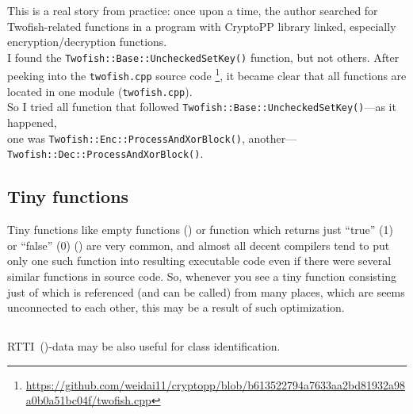 This is a real story from practice: once upon a time, the author searched for Twofish-related functions in
a program with CryptoPP library linked, especially encryption/decryption functions.\\
I found the \verb|Twofish::Base::UncheckedSetKey()| function, but not others.
After peeking into the \verb|twofish.cpp| source code
\footnote{\url{https://github.com/weidai11/cryptopp/blob/b613522794a7633aa2bd81932a98a0b0a51bc04f/twofish.cpp}}, it became clear that all functions are located in one module (\verb|twofish.cpp|).\\
So I tried all function that followed \verb|Twofish::Base::UncheckedSetKey()|---as it happened,\\
one was \verb|Twofish::Enc::ProcessAndXorBlock()|, another---\verb|Twofish::Dec::ProcessAndXorBlock()|.

\subsection{Tiny functions}

Tiny functions like empty functions ()
or function which returns just ``true'' (1) or ``false'' (0) () are very common,
and almost all decent compilers tend to put only one such function into resulting executable code even if there were several
similar functions in source code.
So, whenever you see a tiny function consisting just of 
which is referenced (and can be called) from many places,
which are seems unconnected to each other, this may be a result of such optimization.%

\subsection{\Cpp}

\ac{RTTI}~()-data may be also useful for \Cpp class identification.

